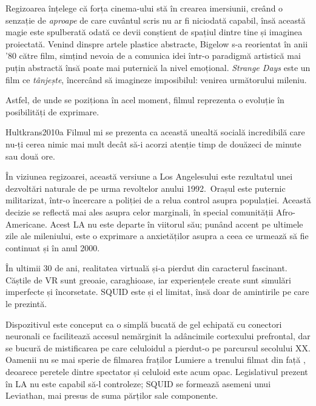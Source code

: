 \documentclass[12pt]{article}
\begin{document}
	 Regizoarea înțelege că forța cinema-ului stă în crearea imersiunii, creând o senzație de \textit{aproape} de care cuvântul scris nu ar fi niciodată capabil, însă această magie este spulberată odată ce devii conștient de spațiul dintre tine și imaginea proiectată. Venind dinspre artele plastice abstracte, Bigelow s-a reorientat în anii '80 către film, simțind nevoia de a comunica idei într-o paradigmă artistică mai puțin abstractă însă poate mai puternică la nivel emoțional. \textit{Strange Days} este un film ce \textit{tânjește}, încercând să imagineze imposibilul: venirea următorului mileniu.
	 
	 Astfel, de unde se poziționa în acel moment, filmul reprezenta o evoluție în posibilități de exprimare.\par
	 
	\begin{displaycquote}{Hultkrans2010a}
		Filmul mi se prezenta ca această unealtă socială incredibilă care nu-ți cerea nimic mai mult decât să-i acorzi atenție timp de douăzeci de minute sau două ore.
	\end{displaycquote}
	
	În viziunea regizoarei, această versiune a Los Angelesului este rezultatul unei dezvoltări naturale de pe urma revoltelor anului 1992. Orașul este puternic militarizat, într-o încercare a poliției de a relua control asupra populației. Această decizie se reflectă mai ales asupra celor marginali, în special comunității Afro-Americane. Acest LA nu este departe în viitorul său; punând accent pe ultimele zile ale mileniului, este o exprimare a anxietăților asupra a ceea ce urmează să fie continuat și în anul 2000.\par
	
	În ultimii 30 de ani, realitatea virtuală și-a pierdut din caracterul fascinant. Căștile de VR sunt greoaie, caraghioase, iar experiențele create sunt simulări imperfecte și încorsetate. SQUID este și el limitat, însă doar de amintirile pe care le prezintă.\par
	
	Dispozitivul este conceput ca o simplă bucată de gel echipată cu conectori neuronali ce facilitează accesul nemărginit la adâncimile cortexului prefrontal, dar se bucură de mistificarea pe care celuloidul a pierdut-o pe parcursul secolului XX. Oamenii nu se mai sperie de filmarea fraților Lumiere a trenului filmat din față \cite{Willistein1995a}, deoarece peretele dintre spectator și celuloid este acum opac. Legislativul prezent în LA nu este capabil să-l controleze; SQUID se formează asemeni unui Leviathan, mai presus de suma părților sale componente.\par
	
\end{document}
